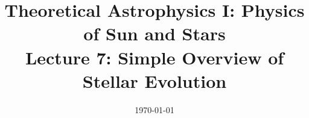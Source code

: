 \documentclass[aspectratio=169]{beamer}
\title{Theoretical Astrophysics I: Physics of Sun and Stars\\
Lecture 7: Simple Overview of Stellar Evolution}
\author{\texorpdfstring{\sepia{Petri K\"{a}pyl\"{a} Ivan Mili\'{c}}\newline\blue{\url{pkapyla, milic@leibniz-kis.de}}}{}}
\institute{Institut f\"ur Sonnenphysik - KIS, Freiburg}
\date{\today}
\begin{document}
\frame{\titlepage}











\end{document}
